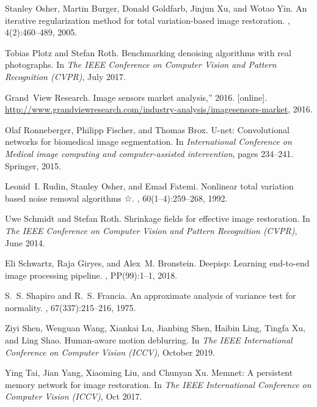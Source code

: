 \documentclass[10pt,twocolumn,letterpaper]{article}
\begin{document}
\begin{thebibliography}{10}
Stanley Osher, Martin Burger, Donald Goldfarb, Jinjun Xu, and Wotao Yin.
\newblock An iterative regularization method for total variation-based image
  restoration.
, 4(2):460--489, 2005.

Tobias Plotz and Stefan Roth.
\newblock Benchmarking denoising algorithms with real photographs.
\newblock In {\em The IEEE Conference on Computer Vision and Pattern
  Recognition (CVPR)}, July 2017.

Grand~View Research.
\newblock Image sensors market analysis,” 2016. [online].
\newblock
  \url{http://www.grandviewresearch.com/industry-analysis/imagesensors-market},
  2016.

Olaf Ronneberger, Philipp Fischer, and Thomas Brox.
\newblock U-net: Convolutional networks for biomedical image segmentation.
\newblock In {\em International Conference on Medical image computing and
  computer-assisted intervention}, pages 234--241. Springer, 2015.

Leonid~I. Rudin, Stanley Osher, and Emad Fatemi.
\newblock Nonlinear total variation based noise removal algorithms ☆.
, 60(1–4):259--268, 1992.

Uwe Schmidt and Stefan Roth.
\newblock Shrinkage fields for effective image restoration.
\newblock In {\em The IEEE Conference on Computer Vision and Pattern
  Recognition (CVPR)}, June 2014.

Eli Schwartz, Raja Giryes, and Alex~M. Bronstein.
\newblock Deepisp: Learning end-to-end image processing pipeline.
, PP(99):1--1, 2018.

S.~S. Shapiro and R.~S. Francia.
\newblock An approximate analysis of variance test for normality.
, 67(337):215--216, 1975.

Ziyi Shen, Wenguan Wang, Xiankai Lu, Jianbing Shen, Haibin Ling, Tingfa Xu, and
  Ling Shao.
\newblock Human-aware motion deblurring.
\newblock In {\em The IEEE International Conference on Computer Vision (ICCV)},
  October 2019.

Ying Tai, Jian Yang, Xiaoming Liu, and Chunyan Xu.
\newblock Memnet: A persistent memory network for image restoration.
\newblock In {\em The IEEE International Conference on Computer Vision (ICCV)},
  Oct 2017.


\end{thebibliography}
\end{document}
